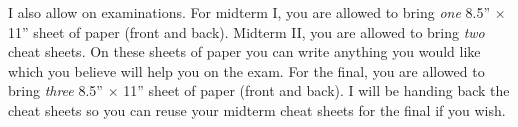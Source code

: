 I also allow  on examinations. For midterm I, you are allowed to bring \textit{one} 8.5'' $\times$ 11'' sheet of paper (front and back).  Midterm II, you are allowed to bring \textit{two} cheat sheets. On these sheets of paper you can write anything you would like which you believe will help you on the exam. For the final, you are allowed to bring \textit{three} 8.5'' $\times$ 11'' sheet of paper (front and back).  I will be handing back the cheat sheets so you can reuse your midterm cheat sheets for the final if you wish. 
